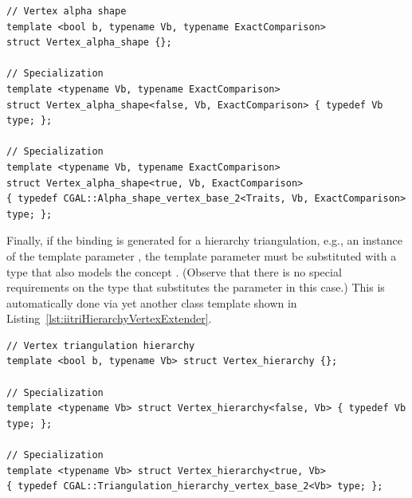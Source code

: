 \begin{lstfloat}
  \begin{lstlisting}[style=cppFramedStyle,basicstyle=\normalsize,%
                     label={lst:iitriASVertexExtender},%
                     caption={The 2D Triangulation for alpha shapes vertex type extender.}]
// Vertex alpha shape
template <bool b, typename Vb, typename ExactComparison> 
struct Vertex_alpha_shape {};

// Specialization
template <typename Vb, typename ExactComparison>
struct Vertex_alpha_shape<false, Vb, ExactComparison> { typedef Vb type; };

// Specialization
template <typename Vb, typename ExactComparison>
struct Vertex_alpha_shape<true, Vb, ExactComparison>
{ typedef CGAL::Alpha_shape_vertex_base_2<Traits, Vb, ExactComparison> type; };
  \end{lstlisting}
\end{lstfloat}

Finally, if the binding is generated for a hierarchy triangulation, e.g., 
an instance of the template parameter
, the
 template parameter must be substituted with
a type that also models the concept
. (Observe that
there is no special requirements on the type that substitutes the
 parameter in this case.) This is automatically done via
yet another class template shown in 
Listing~\ref{lst:iitriHierarchyVertexExtender}.

\begin{lstfloat}
  \begin{lstlisting}[style=cppFramedStyle,basicstyle=\normalsize,%
                     label={lst:iitriHierarchyVertexExtender},%
                     caption={The 2D Triangulation hierarchy vertex type extender.}]
// Vertex triangulation hierarchy
template <bool b, typename Vb> struct Vertex_hierarchy {};

// Specialization
template <typename Vb> struct Vertex_hierarchy<false, Vb> { typedef Vb type; };

// Specialization
template <typename Vb> struct Vertex_hierarchy<true, Vb>
{ typedef CGAL::Triangulation_hierarchy_vertex_base_2<Vb> type; };
  \end{lstlisting}
\end{lstfloat}

